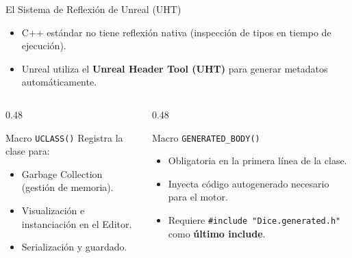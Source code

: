 \documentclass[aspectratio=169, 10pt]{beamer}
\begin{document}
\begin{frame}{El Sistema de Reflexión de Unreal (UHT)}
    \begin{itemize}
        \item C++ estándar no tiene reflexión nativa (inspección de tipos en tiempo de ejecución).
        \item Unreal utiliza el \textbf{Unreal Header Tool (UHT)} para generar metadatos automáticamente.
    \end{itemize}

    \vspace{0.3cm}
    \begin{columns}[T]
        \begin{column}{0.48\textwidth}
            \begin{block}{Macro \texttt{UCLASS()}}
                Registra la clase para:
                \begin{itemize}
                    \item Garbage Collection (gestión de memoria).
                    \item Visualización e instanciación en el Editor.
                    \item Serialización y guardado.
                \end{itemize}
            \end{block}
        \end{column}
        \begin{column}{0.48\textwidth}
            \begin{block}{Macro \texttt{GENERATED\_BODY()}}
                \begin{itemize}
                    \item Obligatoria en la primera línea de la clase.
                    \item Inyecta código autogenerado necesario para el motor.
                    \item Requiere \texttt{\#include "Dice.generated.h"} como \textbf{último include}.
                \end{itemize}
            \end{block}
        \end{column}
    \end{columns}
\end{frame}
\end{document}
